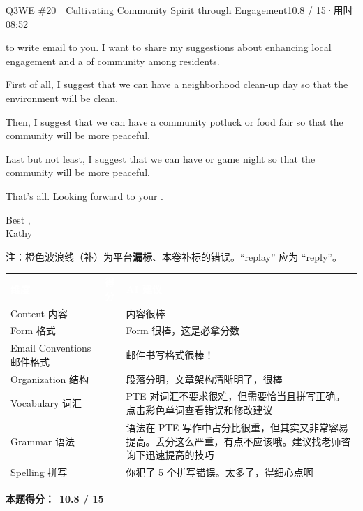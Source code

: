 \begin{qblock}{Q3\quad WE \#20\ \ Cultivating Community Spirit through Engagement}{10.8 / 15\quad·\quad 用时 08:52}
\begin{youbox}
 to write  email to you. I want to share my suggestions about enhancing local engagement and  a  of community among residents.

First of all, I suggest that we can have a neighborhood clean-up day so that the environment will be  clean.

Then, I suggest that we can have a community potluck or food fair so that the community will be more peaceful.

Last but not least, I suggest that we can have  or game night so that the community will be more peaceful.

That's all. Looking forward to your .

Best ,\\ Kathy
\end{youbox}
{\footnotesize\color{gray} 注：橙色波浪线（补）为平台\textbf{漏标}、本卷补标的错误。``replay'' 应为 ``reply''。}

{\small\scorehead
\begin{tabularx}{\linewidth}{l c Y}
\textcolor{white}{\bfseries 维度} & \textcolor{white}{\bfseries 得分} & \textcolor{white}{\bfseries AI 建议}\\
Content 内容              &    & 内容很棒\\
Form 格式                &    & Form 很棒，这是必拿分数\\
Email Conventions 邮件格式 &    & 邮件书写格式很棒！\\
Organization 结构         &    & 段落分明，文章架构清晰明了，很棒\\
Vocabulary 词汇           &    & PTE 对词汇不要求很难，但需要恰当且拼写正确。点击彩色单词查看错误和修改建议\\
Grammar 语法              &  & 语法在 PTE 写作中占分比很重，但其实又非常容易提高。丢分这么严重，有点不应该哦。建议找老师咨询下迅速提高的技巧\\
Spelling 拼写             &    & 你犯了 5 个拼写错误。太多了，得细心点啊\\
\end{tabularx}}
\smallskip
\textbf{本题得分：}\ {\color{cAccent}\bfseries 10.8 / 15}

\end{qblock}

